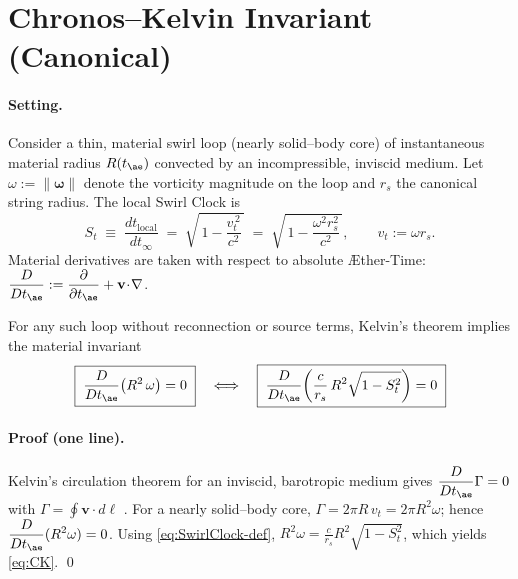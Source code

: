 \documentclass[11pt, a4paper]{article}
\begin{document}
    \section*{Chronos–Kelvin Invariant (Canonical)}
    \label{sec:chronos_kelvin}

    \paragraph{Setting.}
    Consider a thin, material swirl loop (nearly solid–body core) of instantaneous material radius
    $R(t_{\ae})$ convected by an incompressible, inviscid medium. Let $\omega:=\|\boldsymbol{\omega}\|$ denote the
    vorticity magnitude on the loop and $r_s$ the canonical string radius. The local Swirl Clock is
    \begin{equation}
        S_t \;\equiv\; \frac{dt_{\text{local}}}{dt_\infty}
        \;=\;
        \sqrt{\,1-\frac{v_t^{\,2}}{c^2}\,}
        \;=\;
        \sqrt{\,1-\frac{\omega^2 r_s^2}{c^2}\,},\qquad v_t:=\omega r_s .
        \label{eq:SwirlClock-def}
    \end{equation}
    Material derivatives are taken with respect to absolute Æther-Time:
    $\displaystyle \frac{D}{Dt_{\ae}}:=\frac{\partial}{\partial t_{\ae}}+\mathbf{v}\!\cdot\!\nabla$.

    \begin{theorem}
        For any such loop without reconnection or source terms, Kelvin’s theorem implies the
        material invariant
        \begin{equation}
            \boxed{\;
            \frac{D}{Dt_{\ae}}\!\left(R^2\,\omega\right)=0
            \;}
            \quad\Longleftrightarrow\quad
            \boxed{\;
            \frac{D}{Dt_{\ae}}\!\left(
                                    \frac{c}{r_s}\,R^2 \sqrt{1-S_t^2}
            \right)=0
            \;}
            \label{eq:CK}
        \end{equation}
    \end{theorem}

    \paragraph{Proof (one line).}
    Kelvin’s circulation theorem for an inviscid, barotropic medium gives
    $\displaystyle \frac{D}{Dt_{\ae}}\Gamma=0$ with $\Gamma=\oint \mathbf{v}\cdot d\boldsymbol{\ell}$ \cite{Helmholtz1858,Kelvin1869,Batchelor1967}.
    For a nearly solid–body core, $\Gamma=2\pi R\, v_t=2\pi R^2 \omega$; hence
    $\displaystyle \frac{D}{Dt_{\ae}}(R^2\omega)=0$.
    Using \eqref{eq:SwirlClock-def}, $R^2\omega=\tfrac{c}{r_s} R^2\sqrt{1-S_t^2}$, which yields \eqref{eq:CK}. \qed
\end{document}
